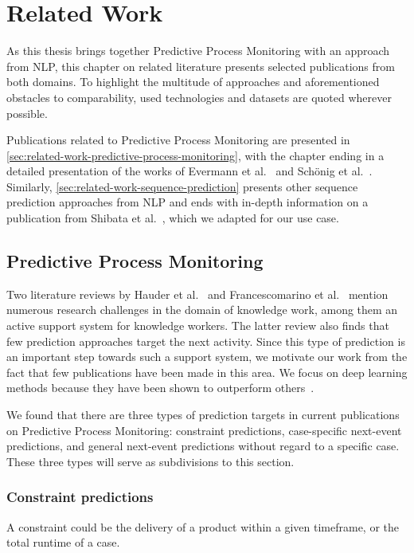 \chapter{Related Work}\label{chap:related-work}
As this thesis brings together Predictive Process Monitoring with an approach from NLP, this chapter on related literature presents selected publications from both domains. To highlight the multitude of approaches and aforementioned obstacles to comparability, used technologies and datasets are quoted wherever possible.

Publications related to Predictive Process Monitoring are presented in \autoref{sec:related-work-predictive-process-monitoring}, with the chapter ending in a detailed presentation of the works of Evermann et al.~\cite{evermann2016} and Schönig et al.~\cite{schoenig2018}. Similarly, \autoref{sec:related-work-sequence-prediction} presents other sequence prediction approaches from NLP and ends with in-depth information on a publication from Shibata et al.~\cite{shibata2016bipartite}, which we adapted for our use case.

\section{Predictive Process Monitoring}
\label{sec:related-work-predictive-process-monitoring}
Two literature reviews by Hauder et al.~\cite{hauder2014} and Francescomarino et al.~\cite{francescomarino2018} mention numerous research challenges in the domain of knowledge work, among them an active support system for knowledge workers. The latter review also finds that few prediction approaches target the next activity. Since this type of prediction is an important step towards such a support system, we motivate our work from the fact that few publications have been made in this area. We focus on deep learning methods because they have been shown to outperform others~\cite{tax2018interdisciplinary}.

We found that there are three types of prediction targets in current publications on Predictive Process Monitoring: constraint predictions, case-specific next-event predictions, and general next-event predictions without regard to a specific case. These three types will serve as subdivisions to this section.

\subsection*{Constraint predictions}
A constraint could be the delivery of a product within a given timeframe, or the total runtime of a case.

